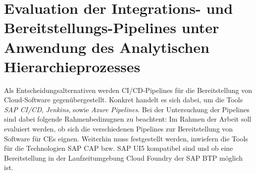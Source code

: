 \section{Evaluation der Integrations- und Bereitstellungs-Pipelines unter Anwendung des Analytischen Hierarchieprozesses}
\label{sec:AHP}
Als Entscheidungsalternativen werden CI/CD-Pipelines für die Bereitstellung von Cloud-Software gegenübergestellt. Konkret handelt es sich dabei, um die Tools \textit{SAP CI/CD}, \textit{Jenkins}, sowie \textit{Azure Pipelines}. Bei der Untersuchung der Pipelines sind dabei folgende Rahmenbedinugnen zu beachtent: Im Rahmen der Arbeit soll evaluiert werden, ob sich die verschiedenen Pipelines zur Bereitstellung von Software für CEs eignen. Weiterhin muss festgestellt werden, inwiefern die Tools für die Technologien SAP CAP bzw. SAP UI5 kompatibel sind und ob eine Bereitstellung in der Laufzeitumgebung Cloud Foundry der SAP BTP möglich ist. 
